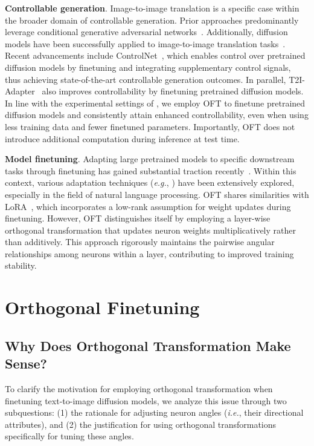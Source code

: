 \textbf{Controllable generation}. Image-to-image translation is a specific case within the broader domain of controllable generation. Prior approaches predominantly leverage conditional generative adversarial networks~\cite{isola2017image,zhu2017toward,wang2018high,park2019semantic,choi2018stargan}. Additionally, diffusion models have been successfully applied to image-to-image translation tasks~\cite{saharia2022palette,voynov2022sketch,wang2022pretraining}. Recent advancements include ControlNet~\cite{zhang2023adding}, which enables control over pretrained diffusion models by finetuning and integrating supplementary control signals, thus achieving state-of-the-art controllable generation outcomes. In parallel, T2I-Adapter~\cite{mou2023t2i} also improves controllability by finetuning pretrained diffusion models. In line with the experimental settings of \cite{zhang2023adding,mou2023t2i}, we employ OFT to finetune pretrained diffusion models and consistently attain enhanced controllability, even when using less training data and fewer finetuned parameters. Importantly, OFT does not introduce additional computation during inference at test time.

\textbf{Model finetuning}. Adapting large pretrained models to specific downstream tasks through finetuning has gained substantial traction recently~\cite{devlin2018bert,brown2020language,he2022masked}. Within this context, various adaptation techniques (\emph{e.g.}, \cite{hulora2022,houlsby2019parameter,pfeiffer2020adapterfusion}) have been extensively explored, especially in the field of natural language processing. OFT shares similarities with LoRA~\cite{hulora2022}, which incorporates a low-rank assumption for weight updates during finetuning. However, OFT distinguishes itself by employing a layer-wise orthogonal transformation that updates neuron weights multiplicatively rather than additively. This approach rigorously maintains the pairwise angular relationships among neurons within a layer, contributing to improved training stability.

\section{Orthogonal Finetuning}

\subsection{Why Does Orthogonal Transformation Make Sense?}

To clarify the motivation for employing orthogonal transformation when finetuning text-to-image diffusion models, we analyze this issue through two subquestions: (1) the rationale for adjusting neuron angles (\emph{i.e.}, their directional attributes), and (2) the justification for using orthogonal transformations specifically for tuning these angles.

